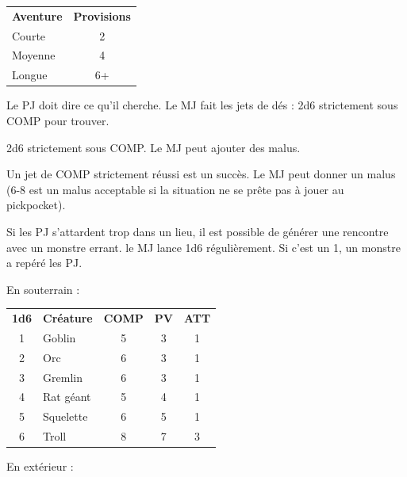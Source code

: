 \begin{frame}[b]
{\begin{minipage}[c][0.95\textheight][c]{\linewidth}
\begin{table}
\begin{tabular}{lc}
\textbf{Aventure} & \textbf{Provisions} \\
Courte & 2 \\
Moyenne & 4 \\
Longue & 6+ \\
\end{tabular}
\end{table}


Le PJ doit dire ce qu'il cherche. Le MJ fait les jets de dés : 2d6 strictement sous COMP pour trouver.


2d6 strictement sous COMP. Le MJ peut ajouter des malus.


Un jet de COMP strictement réussi est un succès. Le MJ peut donner un malus (6-8 est un malus acceptable si la situation ne se prête pas à jouer au pickpocket).


Si les PJ s'attardent trop dans un lieu, il est possible de générer une rencontre avec un monstre errant. le MJ lance 1d6 régulièrement. Si c'est un 1, un monstre a repéré les PJ.

En souterrain :

\begin{center}
\begin{tabular}{clccc}
\textbf{1d6} &  \textbf{Créature} &  \textbf{COMP} &  \textbf{PV} &  \textbf{ATT} \\
    1 & Goblin     &      5 &    3 &     1 \\
    2 & Orc        &      6 &    3 &     1 \\
    3 & Gremlin    &      6 &    3 &     1 \\
    4 & Rat géant  &      5 &    4 &     1 \\
    5 & Squelette  &      6 &    5 &     1 \\
    6 & Troll      &      8 &    7 &     3 \\
\end{tabular}
\end{center}

En extérieur :


\end{minipage}}
\end{frame}
